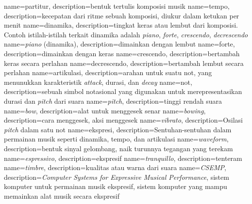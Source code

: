{
    name=partitur,
    description={bentuk tertulis komposisi musik}
}
{
    name=tempo,
    description={kecepatan dari ritme sebuah komposisi, diukur dalam ketukan per menit}
}
{
	name=dinamika,
	description={tingkat keras atau lembut dari komposisi. Contoh istilah-istilah terkait dinamika adalah \textit{piano}, \textit{forte}, \textit{crescendo}, \textit{decrescendo}}
}
{
	name={\textit{piano} (dinamika)},
	description={dimainkan dengan lembut}
}
{
	name={forte},
	description={dimainkan dengan keras}
}
{
	name=crescendo,
	description={bertambah keras secara perlahan}
}
{
	name=decrescendo,
	description={bertambah lembut secara perlahan}
}
{
	name=artikulasi,
	description={arahan untuk suatu not, yang menunukkan karakteristik \textit{attack}, durasi, dan \textit{decay}}
}
{
	name=not,
	description={sebuah simbol notasional yang digunakan untuk merepresentasikan durasi dan \textit{pitch} dari suara}
}
{
	name=\textit{pitch},
	description={tinggi rendah suara}
}
{
	name=\textit{bow},
	description={alat untuk menggesek senar}
}
{
	name=\textit{bowing},
	description={cara menggesek, aksi menggesek}
}
{
	name=\textit{vibrato},
	description={Osilasi \textit{pitch} dalam satu not}
}
{
	name=ekspresi,
	description={Sentuhan-sentuhan dalam permainan musik seperti dinamika, tempo, dan artikulasi}
}
{
	name=\textit{waveform},
	description={bentuk sinyal gelombang, naik turunnya tegangan yang terekam}
}
{
	name=\textit{espressivo},
	description={ekspresif}
}
{
	name=\textit{tranquillo},
	description={tenteram}
}
{
	name=\textit{timbre},
	description={kualitas atau warna dari suara}
}
{
	name=\textit{CSEMP},
	description={\textit{Computer Systems for Expressive Musical Performance}, sistem komputer untuk permainan musik ekspresif, sistem komputer yang mampu memainkan alat musik secara ekspresif}
}